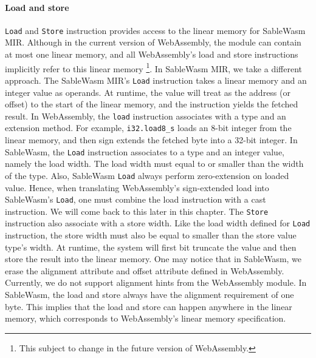 \paragraph{Load and store}
\texttt{Load} and \texttt{Store} instruction provides access to the linear
memory for SableWasm MIR. Although in the current version of WebAssembly, the
module can contain at most one linear memory, and all WebAssembly's load and
store instructions implicitly refer to this linear memory \footnote{This subject
  to change in the future version of WebAssembly.}. In SableWasm MIR, we take a
different approach. The SableWasm MIR's \texttt{Load} instruction takes a linear
memory and an integer value as operands. At runtime, the value will treat as the
address (or offset) to the start of the linear memory, and the instruction
yields the fetched result. In WebAssembly, the \texttt{load} instruction
associates with a type and an extension method. For example,
\texttt{i32.load8\_s} loads an 8-bit integer from the linear memory, and then
sign extends the fetched byte into a 32-bit integer. In SableWasm, the
\texttt{Load} instruction associates to a type and an integer value, namely the
load width. The load width must equal to or smaller than the width of the type.
Also, SableWasm \texttt{Load} always perform zero-extension on loaded value.
Hence, when translating WebAssembly's sign-extended load into SableWasm's
\texttt{Load}, one must combine the load instruction with a cast instruction.
We will come back to this later in this chapter. The \texttt{Store} instruction
also associate with a store width. Like the load width defined for \texttt{Load}
instruction, the store width must also be equal to smaller than the store value
type's width. At runtime, the system will first bit truncate the value and then
store the result into the linear memory. One may notice that in SableWasm, we
erase the alignment attribute and offset attribute defined in WebAssembly.
Currently, we do not support alignment hints from the WebAssembly module. In
SableWasm, the load and store always have the alignment requirement of one byte.
This implies that the load and store can happen anywhere in the linear memory,
which corresponds to WebAssembly's linear memory specification.

